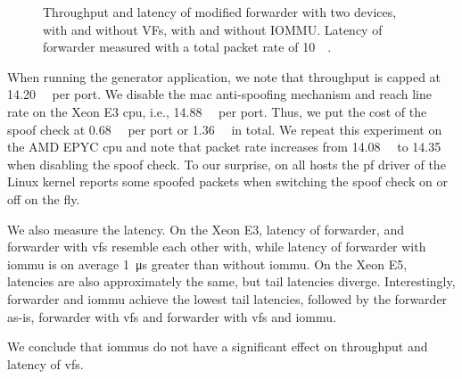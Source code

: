 \begin{figure}%
    \centering
    \par

    \caption{Throughput and latency of modified forwarder with two devices, with
    and without VFs, with and without IOMMU. Latency of forwarder measured with
    a total packet rate of \SI{10}{\mega\pps}.}
    \label{fig:sriov-baseline}
\end{figure}

When running the generator application, we note that throughput is capped at
\SI{14.20}{\mega\pps} per port. We disable the \ac{mac} anti-spoofing mechanism
and reach line rate on the Xeon E3 \ac{cpu}, i.e., \SI{14.88}{\mega\pps} per
port. Thus, we put the cost of the spoof check at \SI{0.68}{\mega\pps} per port
or \SI{1.36}{\mega\pps} in total. We repeat this experiment on the AMD EPYC
\ac{cpu} and note that packet rate increases from \SI{14.08}{\mega\pps} to
\SI{14.35}{\mega\pps} when disabling the spoof check. To our surprise, on all
hosts the \ac{pf} driver of the Linux kernel reports some spoofed packets when
switching the spoof check on or off on the fly.

We also measure the latency. On the Xeon E3, latency of forwarder, and forwarder
with \acp{vf} resemble each other with, while latency of forwarder with
\ac{iommu} is on average \SI{1}{\micro\second} greater than without \ac{iommu}.
On the Xeon E5, latencies are also approximately the same, but tail latencies
diverge. Interestingly, forwarder and \ac{iommu} achieve the lowest tail
latencies, followed by the forwarder as-is, forwarder with \acp{vf} and
forwarder with \acp{vf} and \ac{iommu}.

We conclude that \acp{iommu} do not have a significant effect on throughput and
latency of \acp{vf}.


